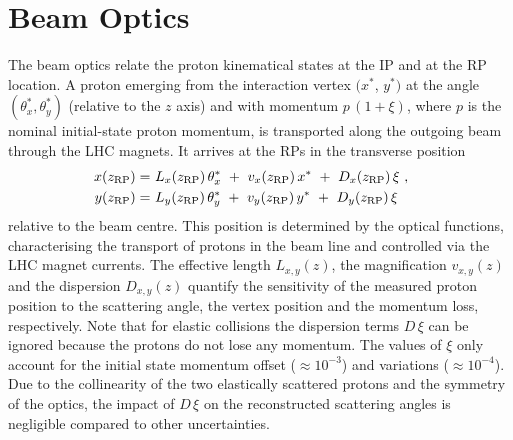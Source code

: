 \section{Beam Optics}
\label{sec:beam optics}

The beam optics relate the proton kinematical states at the IP and at the RP location. A proton emerging from the interaction vertex $(x^*$, $y^*)$ at the angle $(\theta_x^*,\theta_y^*)$ (relative to the $z$ axis) and with momentum $p\,(1+\xi)$, where $p$ is the nominal initial-state proton momentum, is transported along the outgoing beam through the LHC magnets. It arrives at the RPs in the transverse position
\begin{equation}
\label{eq:prot trans}
	\begin{aligned}
		x(z_{\rm RP}) =\ & L_x(z_{\rm RP})\, \theta_x^*\ +\ v_x(z_{\rm RP})\, x^*\ +\ D_x(z_{\rm RP})\, \xi\ ,\cr
		y(z_{\rm RP}) =\ & L_y(z_{\rm RP})\, \theta_y^*\ +\ v_y(z_{\rm RP})\, y^*\ +\ D_y(z_{\rm RP})\, \xi \quad
	\end{aligned}
\end{equation}
relative to the beam centre. This position is determined by the optical functions, characterising the transport of protons in the beam line and controlled via the LHC magnet currents.
The effective length $L_{x,y}(z)$, the magnification $v_{x,y}(z)$ and the dispersion $D_{x,y}(z)$ quantify the sensitivity of the measured proton position to the scattering angle, the vertex position and the momentum loss, respectively. Note that for elastic collisions the dispersion terms $D\,\xi$ can be ignored because the protons do not lose any momentum. The values of $\xi$ only account for the initial state momentum offset ($\approx 10^{-3}$) and variations ($\approx 10^{-4}$). Due to the collinearity of the two elastically scattered protons and the symmetry of the optics, the impact of $D\,\xi$ on the reconstructed scattering angles is negligible compared to other uncertainties.


